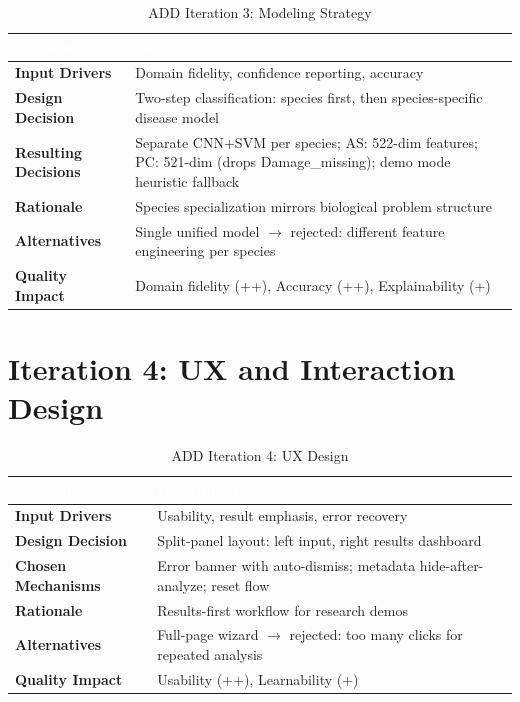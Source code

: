 \documentclass[11pt,a4paper,oneside]{report}
\begin{document}
\begin{table}[H]
\centering\footnotesize
\caption{ADD Iteration 3: Modeling Strategy}
\label{tab:add-iter3}
\begin{tabularx}{\textwidth}{>{\bfseries}p{2.8cm} X}
\toprule
\rowcolor{tableheader}
\textcolor{white}{Element} & \textcolor{white}{Description} \\
\midrule
Input Drivers     & Domain fidelity, confidence reporting, accuracy \\
Design Decision   & Two-step classification: species first, then species-specific disease model \\
Resulting Decisions & Separate CNN+SVM per species; AS: 522-dim features; PC: 521-dim (drops Damage\_missing); demo mode heuristic fallback \\
Rationale         & Species specialization mirrors biological problem structure \\
Alternatives      & Single unified model $\to$ rejected: different feature engineering per species \\
Quality Impact    & Domain fidelity (++), Accuracy (++), Explainability (+) \\
\bottomrule
\end{tabularx}
\end{table}


\section{Iteration 4: UX and Interaction Design}

\begin{table}[H]
\centering\footnotesize
\caption{ADD Iteration 4: UX Design}
\label{tab:add-iter4}
\begin{tabularx}{\textwidth}{>{\bfseries}p{2.8cm} X}
\toprule
\rowcolor{tableheader}
\textcolor{white}{Element} & \textcolor{white}{Description} \\
\midrule
Input Drivers     & Usability, result emphasis, error recovery \\
Design Decision   & Split-panel layout: left input, right results dashboard \\
Chosen Mechanisms & Error banner with auto-dismiss; metadata hide-after-analyze; reset flow \\
Rationale         & Results-first workflow for research demos \\
Alternatives      & Full-page wizard $\to$ rejected: too many clicks for repeated analysis \\
Quality Impact    & Usability (++), Learnability (+) \\
\bottomrule
\end{tabularx}
\end{table}
\end{document}
